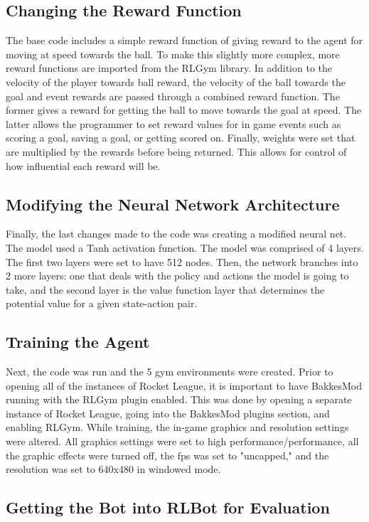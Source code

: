 \documentclass[10pt,twocolumn]{article}
\begin{document}
\subsection{Changing the Reward Function}

The base code includes a simple reward function of giving reward to the agent for moving at speed towards the ball. To make this slightly more complex, more reward functions are imported from the RLGym library. In addition to the velocity of the player towards ball reward, the velocity of the ball towards the goal and event rewards are passed through a combined reward function. The former gives a reward for getting the ball to move towards the goal at speed. The latter allows the programmer to set reward values for in game events such as scoring a goal, saving a goal, or getting scored on. Finally, weights were set that are multiplied by the rewards before being returned. This allows for control of how influential each reward will be. 

\subsection{Modifying the Neural Network Architecture}
Finally, the last changes made to the code was creating a modified neural net. The model used a Tanh activation function. The model was comprised of 4 layers. The first two layers were set to have 512 nodes. Then, the network branches into 2 more layers: one that deals with the policy and actions the model is going to take, and the second layer is the value function layer that determines the potential value for a given state-action pair.


\subsection{Training the Agent}
Next, the code was run and the 5 gym environments were created. Prior to opening all of the instances of Rocket League, it is important to have BakkesMod running with the RLGym plugin enabled. This was done by opening a separate instance of Rocket League, going into the BakkesMod plugins section, and enabling RLGym. While training, the in-game graphics and resolution settings were altered. All graphics settings were set to high performance/performance, all the graphic effects were turned off, the fps was set to "uncapped," and the resolution was set to 640x480 in windowed mode.

\subsection{Getting the Bot into RLBot for Evaluation}
\end{document}
